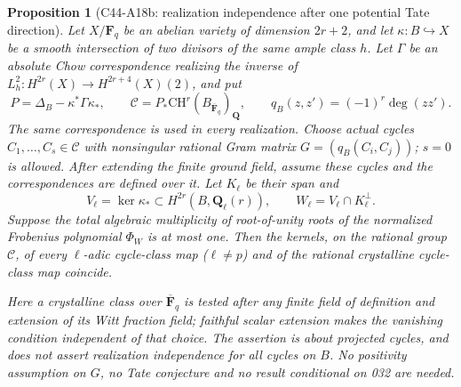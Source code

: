 \documentclass[11pt]{article}
\newtheorem{proposition}[theorem]{Proposition}
\theoremstyle{remark}\newtheorem{remark}[theorem]{Remark}
\begin{document}
\begin{proposition}[C44-A18b: realization independence after one potential Tate direction]
Let $X/\mathbf F_q$ be an abelian variety of dimension $2r+2$,
and let $\kappa:B\hookrightarrow X$ be a smooth intersection of two
divisors of the same ample class $h$. Let $\Gamma$ be an absolute
Chow correspondence realizing the inverse of
$L_h^2:H^{2r}(X)\longrightarrow H^{2r+4}(X)(2)$, and put
\[
 P=\Delta_B-\kappa^*\Gamma\kappa_*,\qquad
 \mathscr C=P_*\mathrm{CH}^r(B_{\overline{\mathbf F}_q})_{\mathbf Q},
 \qquad q_B(z,z')=(-1)^r\deg(zz').
 \tag{A18b.1}
\]
The same correspondence is used in every realization. Choose actual
cycles $C_1,\ldots,C_s\in\mathscr C$ with nonsingular rational Gram
matrix $G=(q_B(C_i,C_j))$; $s=0$ is allowed. After extending the finite
ground field, assume these cycles and the correspondences are defined
over it. Let $K_\ell$ be their span and
\[
 V_\ell=\ker\kappa_*\subset H^{2r}(B,\mathbf Q_\ell(r)),\qquad
 W_\ell=V_\ell\cap K_\ell^\perp.
\]
Suppose the total algebraic multiplicity of root-of-unity roots of
the normalized Frobenius polynomial $\Phi_W$ is at most one.
Then the kernels, on the rational group $\mathscr C$, of every
$\ell$-adic cycle-class map ($\ell\ne p$) and of the rational
crystalline cycle-class map coincide.

Here a crystalline class over $\overline{\mathbf F}_q$ is tested after
any finite field of definition and extension of its Witt fraction
field; faithful scalar extension makes the vanishing condition
independent of that choice. The assertion is about projected cycles,
and does not assert realization independence for all cycles on $B$.
No positivity assumption on $G$, no Tate conjecture and no result
conditional on 032 are needed.
\end{proposition}
\end{document}
